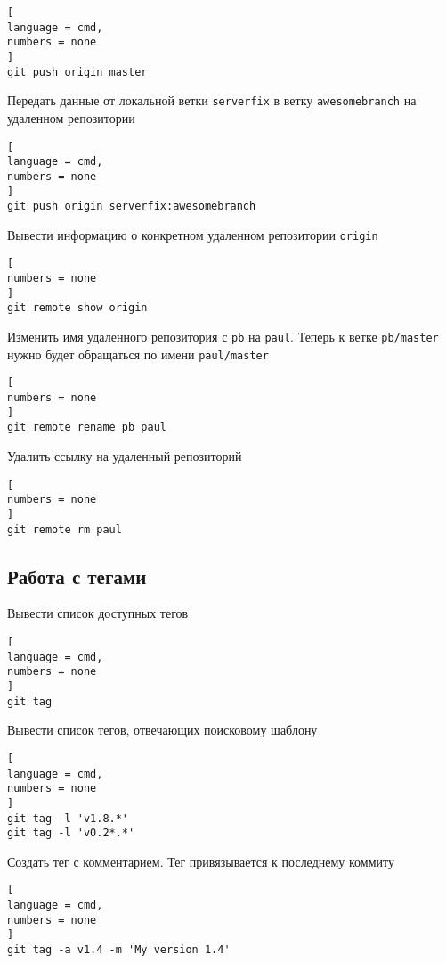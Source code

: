 \documentclass[%
	11pt,
	a4paper,
	utf8,
		]{article}
\begin{document}
\begin{lstlisting}[
language = cmd,
numbers = none
]
git push origin master
\end{lstlisting}


Передать данные от локальной ветки \texttt{serverfix} в ветку \texttt{awesomebranch} на удаленном репозитории

\begin{lstlisting}[
language = cmd,
numbers = none
]
git push origin serverfix:awesomebranch
\end{lstlisting}

Вывести информацию о конкретном удаленном репозитории \texttt{origin}

\begin{lstlisting}[
numbers = none
]
git remote show origin
\end{lstlisting}


Изменить имя удаленного репозитория с \texttt{pb} на \texttt{paul}. Теперь к ветке \texttt{pb/master} нужно будет обращаться по имени \texttt{paul/master}

\begin{lstlisting}[
numbers = none
]
git remote rename pb paul
\end{lstlisting}


Удалить ссылку на удаленный репозиторий

\begin{lstlisting}[
numbers = none
]
git remote rm paul
\end{lstlisting}


\subsection{Работа с тегами}

Вывести список доступных тегов

\begin{lstlisting}[
language = cmd,
numbers = none
]
git tag
\end{lstlisting}


Вывести список тегов, отвечающих поисковому  шаблону

\begin{lstlisting}[
language = cmd,
numbers = none
]
git tag -l 'v1.8.*'
git tag -l 'v0.2*.*'
\end{lstlisting}


Создать тег с комментарием. Тег привязывается к последнему коммиту

\begin{lstlisting}[
language = cmd,
numbers = none
]
git tag -a v1.4 -m 'My version 1.4'
\end{lstlisting}
\end{document}

